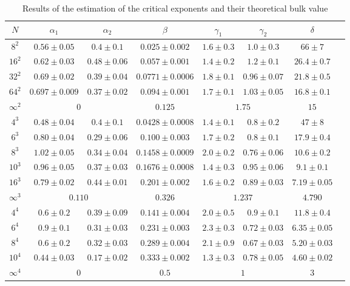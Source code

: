 \documentclass[a4paper, 11pt]{article}
\begin{document}
      \begin{table}
        \centering
        \begin{tabular}{c|ccccccc}
          \toprule
          $N$ & $\alpha_1$ & $\alpha_2$ & $\beta$ & $\gamma_1$ & $\gamma_2$ & $\delta$ \\
          \midrule
          $8^2$ & $0.56 \pm 0.05$ & $0.4 \pm 0.1$ & $0.025 \pm 0.002$ & $1.6 \pm 0.3$ & $1.0 \pm 0.3$ & $66 \pm 7$\\
          $16^2$ & $0.62 \pm 0.03$ & $0.48 \pm 0.06$ & $0.057 \pm 0.001$ & $1.4 \pm 0.2$ & $1.2 \pm 0.1$ & $26.4 \pm 0.7$\\
          $32^2$ & $0.69 \pm 0.02$ & $0.39 \pm 0.04$ & $0.0771 \pm 0.0006$ & $1.8 \pm 0.1$ & $0.96 \pm 0.07$ & $21.8 \pm 0.5$\\
          $64^2$ & $0.697 \pm 0.009$ & $0.37 \pm 0.02$ & $0.094 \pm 0.001$ & $1.7 \pm 0.1$ & $1.03 \pm 0.05$ & $16.8 \pm 0.1$\\
          $\infty^2$ & \multicolumn{2}{c}{$0$} & $0.125$ & \multicolumn{2}{c}{$1.75$} & $15$\\
          \midrule
          $4^3$ & $0.48 \pm 0.04$ & $0.4 \pm 0.1$ & $0.0428 \pm 0.0008$ & $1.4 \pm 0.1$ & $0.8 \pm 0.2$ & $47 \pm 8$\\
          $6^3$ & $0.80 \pm 0.04$ & $0.29 \pm 0.06$ & $0.100 \pm 0.003$ & $1.7 \pm 0.2$ & $0.8 \pm 0.1$ & $17.9 \pm 0.4$\\
          $8^3$ & $1.02 \pm 0.05$ & $0.34 \pm 0.04$ & $0.1458 \pm 0.0009$ & $2.0 \pm 0.2$ & $0.76 \pm 0.06$ & $10.6 \pm 0.2$\\
          $10^3$ & $0.96 \pm 0.05$ & $0.37 \pm 0.03$ & $0.1676 \pm 0.0008$ & $1.4 \pm 0.3$ & $0.95 \pm 0.06$ & $9.1 \pm 0.1$\\
          $16^3$ & $0.79 \pm 0.02$ & $0.44 \pm 0.01$ & $0.201 \pm 0.002$ & $1.6 \pm 0.2$ & $0.89 \pm 0.03$ & $7.19 \pm 0.05$\\
          $\infty^3$ & \multicolumn{2}{c}{$0.110$} & $0.326$ & \multicolumn{2}{c}{$1.237$} & $4.790$\\
          \midrule
          $4^4$ & $0.6 \pm 0.2$ & $0.39 \pm 0.09$ & $0.141 \pm 0.004$ & $2.0 \pm 0.5$ & $0.9 \pm 0.1$ & $11.8 \pm 0.4$\\
          $6^4$ & $0.9 \pm 0.1$ & $0.31 \pm 0.03$ & $0.231 \pm 0.003$ & $2.3 \pm 0.3$ & $0.72 \pm 0.03$ & $6.35 \pm 0.05$\\
          $8^4$ & $0.6 \pm 0.2$ & $0.32 \pm 0.03$ & $0.289 \pm 0.004$ & $2.1 \pm 0.9$ & $0.67 \pm 0.03$ & $5.20 \pm 0.03$\\
          $10^4$ & $0.44 \pm 0.03$ & $0.17 \pm 0.02$ & $0.333 \pm 0.002$ & $1.3 \pm 0.3$ & $0.78 \pm 0.05$ & $4.60 \pm 0.02$\\
          $\infty^4$ & \multicolumn{2}{c}{$0$} & $0.5$ & \multicolumn{2}{c}{$1$} & $3$\\
          \bottomrule
        \end{tabular}
        \caption{Results of the estimation of the critical exponents and their theoretical bulk value}
        \label{tab:exponents}
      \end{table}
\end{document}

